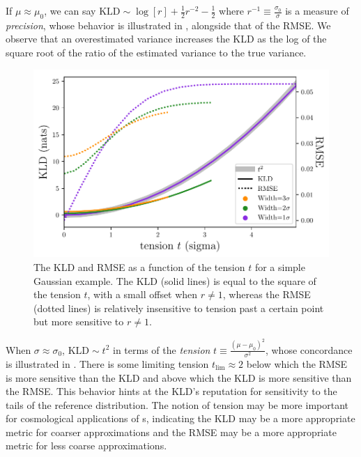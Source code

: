 If $\mu \approx \mu_{0}$, we can say $\mathrm{KLD}\sim\log[r] + \frac{1}{2}r^{-2} - \frac{1}{2}$ where $r^{-1} \equiv \frac{\sigma_{0}}{\sigma}$ is a measure of \textit{precision}, whose behavior is illustrated in , alongside that of the RMSE.  
We observe that an overestimated variance increases the KLD as the log of the square root of the ratio of the estimated variance to the true variance.

\begin{figure}
	\begin{center}
		\includegraphics[width=0.74\columnwidth]{figures/qp/tension.pdf}
		\caption{The KLD and RMSE as a function of the tension $t$ for a simple Gaussian example.
			The KLD (solid lines) is equal to the square of the tension $t$, with a small offset when $r \neq 1$, whereas the RMSE (dotted lines) is relatively insensitive to tension past a certain point but more sensitive to $r \neq 1$.
			}
	\end{center}
\end{figure}

When $\sigma \approx \sigma_{0}$, $\mathrm{KLD} \sim t^{2}$ in terms of the \textit{tension} $t \equiv \frac{(\mu - \mu_{0})^{2}}{\sigma^{2}}$, whose concordance is illustrated in .
There is some limiting tension $t_{\mathrm{lim}} \approx 2$ below which the RMSE is more sensitive than the KLD and above which the KLD is more sensitive than the RMSE.
This behavior hints at the KLD's reputation for sensitivity to the tails of the reference distribution.
The notion of tension may be more important for cosmological applications of \pz s, indicating the KLD may be a more appropriate metric for coarser approximations and the RMSE may be a more appropriate metric for less coarse approximations.
